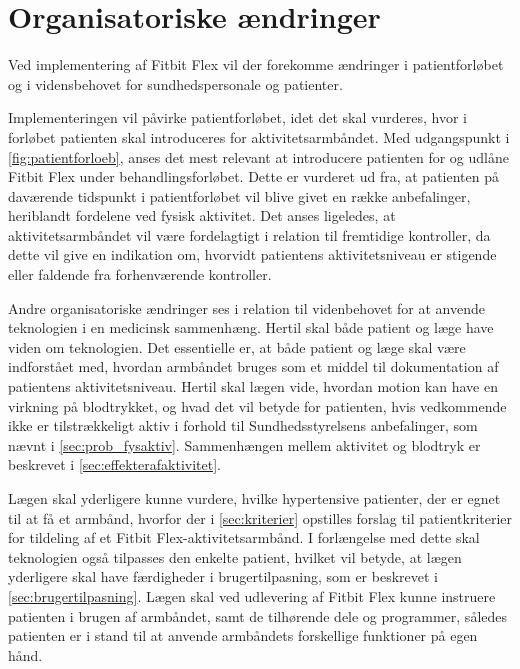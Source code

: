 \section{Organisatoriske ændringer}\label{sec:org_aendringer}
Ved implementering af Fitbit Flex vil der forekomme ændringer i patientforløbet og i vidensbehovet for sundhedspersonale og patienter. 

Implementeringen vil påvirke patientforløbet, idet det skal vurderes, hvor i forløbet patienten skal introduceres for aktivitetsarmbåndet. 
Med udgangspunkt i \autoref{fig:patientforloeb}, anses det mest relevant at introducere patienten for og udlåne Fitbit Flex under behandlingsforløbet. Dette er vurderet ud fra, at patienten på daværende tidspunkt i patientforløbet vil blive givet en række anbefalinger, heriblandt fordelene ved fysisk aktivitet. 
Det anses ligeledes, at aktivitetsarmbåndet vil være fordelagtigt i relation til fremtidige kontroller, da dette vil give en indikation om, hvorvidt patientens aktivitetsniveau er stigende eller faldende fra forhenværende kontroller.   

Andre organisatoriske ændringer ses i relation til videnbehovet for at anvende teknologien i en medicinsk sammenhæng. Hertil skal både patient og læge have viden om teknologien. Det essentielle er, at både patient og læge skal være indforstået med, hvordan armbåndet bruges som et middel til dokumentation af patientens aktivitetsniveau. Hertil skal lægen vide, hvordan motion kan have en virkning på blodtrykket, og hvad det vil betyde for patienten, hvis vedkommende ikke er tilstrækkeligt aktiv i forhold til Sundhedsstyrelsens anbefalinger, som nævnt i \autoref{sec:prob_fysaktiv}. Sammenhængen mellem aktivitet og blodtryk er beskrevet i \autoref{sec:effekterafaktivitet}.

Lægen skal yderligere kunne vurdere, hvilke hypertensive patienter, der er egnet til at få et armbånd, hvorfor der i \autoref{sec:kriterier} opstilles forslag til patientkriterier for tildeling af et Fitbit Flex-aktivitetsarmbånd. I forlængelse med dette skal teknologien også tilpasses den enkelte patient, hvilket vil betyde, at lægen yderligere skal have færdigheder i brugertilpasning, som er beskrevet i \autoref{sec:brugertilpasning}. Lægen skal ved udlevering af Fitbit Flex kunne instruere patienten i brugen af armbåndet, samt de tilhørende dele og programmer, således patienten er i stand til at anvende armbåndets forskellige funktioner på egen hånd. \\

